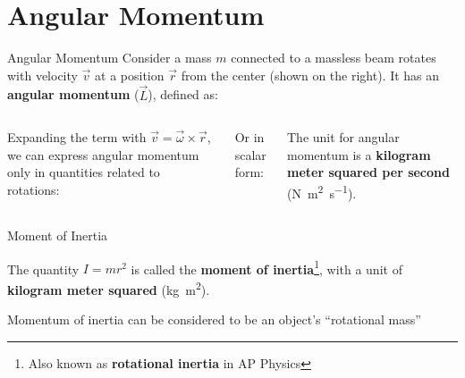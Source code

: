 \documentclass[12pt,compress,aspectratio=169]{beamer}
\begin{document}
\section{Angular Momentum}

\begin{frame}{Angular Momentum}
  Consider a mass $m$ connected to a massless beam rotates with velocity
  $\vec v$ at a position $\vec r$ from the center (shown on the right). It has
  an \textbf{angular momentum} ($\vec L$), defined as:
  \begin{columns}
    

    \vspace{-.1in}Expanding the term with $\vec v=\vec\omega\times\vec r$, we
    can express angular momentum only in quantities related to rotations:

    
    \vspace{-.2in}Or in scalar form:
    

    \vspace{-.2in}The unit for angular momentum is a
    \textbf{kilogram meter squared per second}
    (\si{\newton\metre\squared\per\second}).
    
  \end{columns}
\end{frame}



\begin{frame}{Moment of Inertia}
    
    
  The quantity $I=mr^2$ is called the \textbf{moment of inertia}\footnote{Also
  known as \textbf{rotational inertia} in AP Physics}, with a unit of
  \textbf{kilogram meter squared} (\si{\kilo\gram\metre\squared}).


  \vspace{-.15in}Momentum of inertia can be considered to be an object's
  ``rotational mass''
  \vspace{.3in}
\end{frame}
\end{document}
